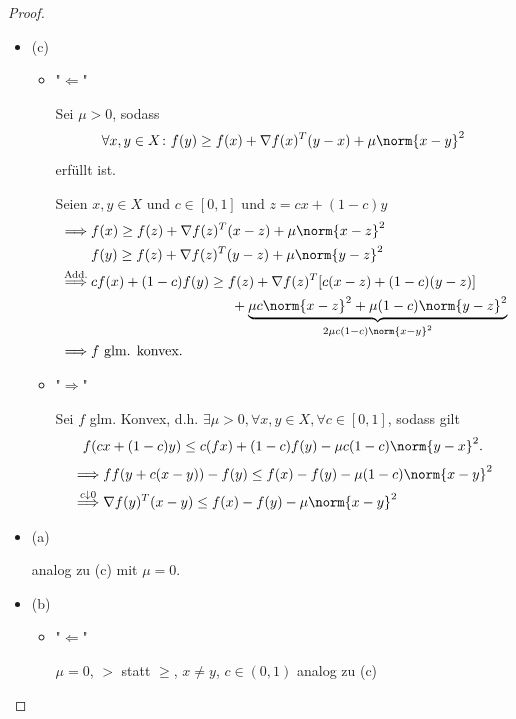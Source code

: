 \begin{proof}
\label{thm:konvexcharakterisierungbeweis}

\begin{itemize}[label=]
	Wir beweisen zunächst Fall (c), da der Rest schnell aus diesem Fall folgt.
	\item (c)
		\begin{itemize}[label=]
			\item "$\Leftarrow$"

 		Sei $\mu>0$, sodass 
		\[
		\forall x,y \in X \colon f(y)\geq f(x) + \nabla f(x)^{T}(y-x) + \mu \norm{x-y} ^2
		\] 
		erfüllt ist.

Seien $x,y \in X$ und $c \in [0,1]$ und $z = cx +(1-c)y$
\begin{align*}
	\implies & f(x) \geq f(z) + \nabla f(z)^{T}(x-z) + \mu \norm{x-z} ^2 \\
			 &f(y) \geq f(z) + \nabla f(z)^{T}(y-z) + \mu \norm{y-z} ^2 \\
	\overset{\text{Add.}}{\implies} &cf(x) + (1-c)f(y) \geq f(z) + \nabla f(z)^{T}[c(x-z) + (1-c)(y-z)] \\
									&\qquad\qquad\qquad\qquad\qquad+\underbrace{\mu c \norm{x-z} ^2 + \mu(1-c) \norm{y-z} ^2}_{2\mu c(1-c) \norm{x-y} ^2}  \\
	\implies &f \text{ glm. konvex.}
\end{align*}

\item "$\Rightarrow$"

	Sei $f$ glm. Konvex, d.h. $\exists \mu > 0, \forall x,y \in X, \forall c \in [0,1]$, sodass gilt
	\[
	f(cx+(1-c)y) \leq c(fx) + (1-c)f(y) - \mu  c(1-c) \norm{y-x} ^2
	.\] 
\begin{align*}
	\implies &f f(y+ c(x-y)) - f(y) \leq f(x) - f(y) - \mu (1-c)\norm{x-y}^2 \\
	\overset{c \downarrow 0}{\implies} & \nabla f(y)^{T}(x-y) \leq f(x) - f(y) - \mu \norm{x-y} ^2
\end{align*}
		\end{itemize}

	\item (a)

		analog zu (c) mit $\mu = 0$.

	\item (b)

		\begin{itemize}[label=]
			\item "$\Leftarrow$"

 $\mu=0$, $>$ statt $\geq$, $x \neq y$, $c \in(0,1)$ analog zu (c)


\end{itemize}
\end{itemize}
\end{proof}
